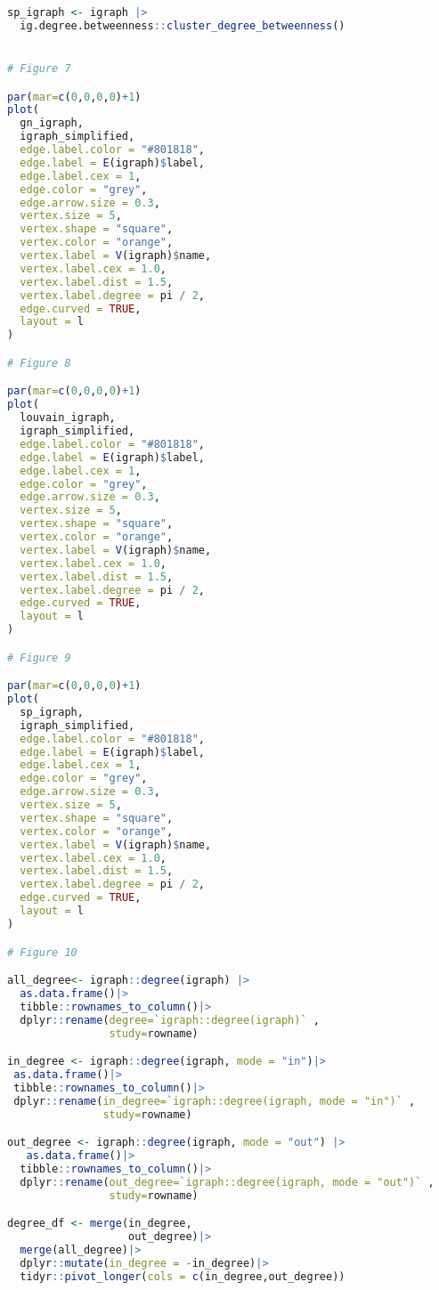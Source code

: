 \documentclass{article}
\begin{document}
\begin{lstlisting}[language=R]
sp_igraph <- igraph |>
  ig.degree.betweenness::cluster_degree_betweenness()


# Figure 7

par(mar=c(0,0,0,0)+1)
plot(
  gn_igraph,
  igraph_simplified,
  edge.label.color = "#801818",
  edge.label = E(igraph)$label,
  edge.label.cex = 1,
  edge.color = "grey",
  edge.arrow.size = 0.3,
  vertex.size = 5,
  vertex.shape = "square",
  vertex.color = "orange",
  vertex.label = V(igraph)$name,
  vertex.label.cex = 1.0,
  vertex.label.dist = 1.5,
  vertex.label.degree = pi / 2,
  edge.curved = TRUE,
  layout = l
)

# Figure 8

par(mar=c(0,0,0,0)+1)
plot(
  louvain_igraph,
  igraph_simplified,
  edge.label.color = "#801818",
  edge.label = E(igraph)$label,
  edge.label.cex = 1,
  edge.color = "grey",
  edge.arrow.size = 0.3,
  vertex.size = 5,
  vertex.shape = "square",
  vertex.color = "orange",
  vertex.label = V(igraph)$name,
  vertex.label.cex = 1.0,
  vertex.label.dist = 1.5,
  vertex.label.degree = pi / 2,
  edge.curved = TRUE,
  layout = l
)

# Figure 9

par(mar=c(0,0,0,0)+1)
plot(
  sp_igraph,
  igraph_simplified,
  edge.label.color = "#801818",
  edge.label = E(igraph)$label,
  edge.label.cex = 1,
  edge.color = "grey",
  edge.arrow.size = 0.3,
  vertex.size = 5,
  vertex.shape = "square",
  vertex.color = "orange",
  vertex.label = V(igraph)$name,
  vertex.label.cex = 1.0,
  vertex.label.dist = 1.5,
  vertex.label.degree = pi / 2,
  edge.curved = TRUE,
  layout = l
)

# Figure 10

all_degree<- igraph::degree(igraph) |> 
  as.data.frame()|>
  tibble::rownames_to_column()|>
  dplyr::rename(degree=`igraph::degree(igraph)` ,
                study=rowname)

in_degree <- igraph::degree(igraph, mode = "in")|>
 as.data.frame()|>
 tibble::rownames_to_column()|>
 dplyr::rename(in_degree=`igraph::degree(igraph, mode = "in")` ,
               study=rowname)

out_degree <- igraph::degree(igraph, mode = "out") |>
   as.data.frame()|>
  tibble::rownames_to_column()|>
  dplyr::rename(out_degree=`igraph::degree(igraph, mode = "out")` ,
                study=rowname)

degree_df <- merge(in_degree,
                   out_degree)|>
  merge(all_degree)|>
  dplyr::mutate(in_degree = -in_degree)|>
  tidyr::pivot_longer(cols = c(in_degree,out_degree))


\end{lstlisting}
\end{document}
